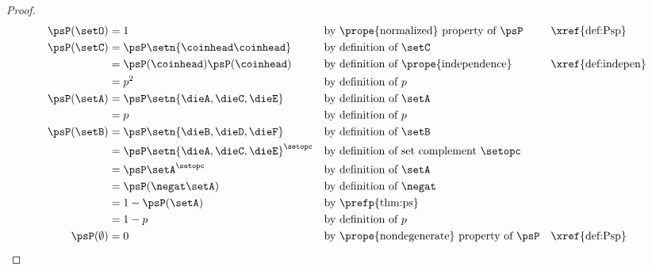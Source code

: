 \begin{proof}
\begin{align*}
  \psP(\setO)
    &= 1
    && \text{by \prope{normalized} property of $\psP$}
    && \text{\xref{def:Psp}}
  \\
  \psP(\setC)
    &= \psP\setn{\coinhead\coinhead}
    && \text{by definition of $\setC$}
  \\&= \psP(\coinhead)\psP(\coinhead)
    && \text{by definition of \prope{independence}}
    && \text{\xref{def:indepen}}
  \\&= p^2
    && \text{by definition of $p$}
  \\
  \psP(\setA)
    &= \psP\setn{\dieA,\dieC,\dieE}
    && \text{by definition of $\setA$}
  \\&= p
    && \text{by definition of $p$}
  \\
  \psP(\setB)
    &= \psP\setn{\dieB,\dieD,\dieF}
    && \text{by definition of $\setB$}
  \\&= \psP\setn{\dieA,\dieC,\dieE}^\setopc
    && \text{by definition of set complement $\setopc$}
  \\&= \psP\setA^\setopc
    && \text{by definition of $\setA$}
  \\&= \psP(\negat\setA)
    && \text{by definition of $\negat$}
  \\&= 1-\psP(\setA)
    && \text{by \prefp{thm:ps}}
  \\&= 1-p
    && \text{by definition of $p$}
  \\
  \psP(\emptyset)
    &= 0
    && \text{by \prope{nondegenerate} property of $\psP$}
    && \text{\xref{def:Psp}}
\end{align*}
\end{proof}


